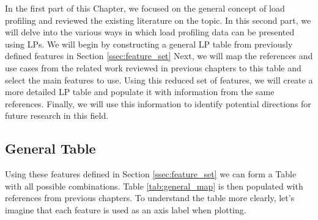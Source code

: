In the first part of this Chapter, we focused on the general concept of load profiling and reviewed the existing literature on the topic.
In this second part, we will delve into the various ways in which load profiling data can be presented using LPs. 
We will begin by constructing a general LP table from previously defined features in Section \ref{ssec:feature_set}
Next, we will map the references and use cases from the related work reviewed in previous chapters to this table and select the main features to use.
Using this reduced set of features, we will create a more detailed LP table and populate it with information from the same references.
Finally, we will use this information to identify potential directions for future research in this field.



\subsection{General Table}
Using these features defined in Section \ref{ssec:feature_set} we can form a Table with all possible combinations.
Table \ref{tab:general_map} is then populated with references from previous chapters.
To understand the table more clearly, let's imagine that each feature is used as an axis label when plotting. 

